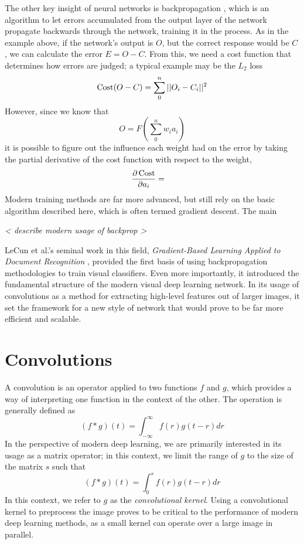 The other key insight of neural networks is backpropagation \cite{hecht1988theory}, which is an algorithm to let errors accumulated from the output layer of the network propagate backwards through the network, training it in the process.
As in the example above, if the network's output is $O$, but the correct response would be $C$, we can calculate the error $E = O - C$.
From this, we need a cost function that determines how errors are judged; a typical example may be the $L_2$ loss
\[\operatorname{Cost}(O - C) = \sum_0^n || O_i - C_i ||^2 \]
However, since we know that
\[O = F\left(\sum_0^n w_i a_i\right)\]
it is possible to figure out the influence each weight had on the error by taking the partial derivative of the cost function with respect to the weight,
\begin{align*}
\frac{\partial \operatorname{Cost}}{\partial a_i} &= 
\end{align*}
Modern training methods are far more advanced, but still rely on the basic algorithm described here, which is often termed gradient descent.
The main 

\emph{< describe modern usage of backprop >}

LeCun et al.'s seminal work in this field, \emph{Gradient-Based Learning Applied to Document Recognition} \cite{lecun1998gradient}, provided the first basis of using backpropagation methodologies to train visual classifiers.
Even more importantly, it introduced the fundamental structure of the modern visual deep learning network.
In its usage of convolutions as a method for extracting high-level features out of larger images, it set the framework for a new style of network that would prove to be far more efficient and scalable.

\section{Convolutions}
A convolution is an operator applied to two functions $f$ and $g$, which provides a way of interpreting one function in the context of the other.
The operation is generally defined as
\[(f * g)(t) = \int_{-\infty}^\infty f(r)g(t-r) dr\]
In the perspective of modern deep learning, we are primarily interested in its usage as a matrix operator; in this context, we limit the range of $g$ to the size of the matrix $s$ such that
\[(f * g)(t) = \int_0^s f(r)g(t-r) dr\]
In this context, we refer to $g$ as the \emph{convolutional kernel}.
Using a convolutional kernel to preprocess the image proves to be critical to the performance of modern deep learning methods, as a small kernel can operate over a large image in parallel.

